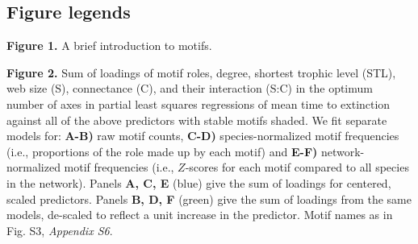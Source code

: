 \documentclass[12pt]{article}
\begin{document}
\begin{spacing}{2.0}
\section*{Figure legends}

        \textbf{Figure 1.} A brief introduction to motifs.

        \vspace{12pt}

        \noindent \textbf{Figure 2.} Sum of loadings of motif roles, degree, shortest trophic level (STL), web size (S), connectance (C), and their interaction (S:C) in the optimum number of axes in partial least squares regressions of mean time to extinction against all of the above predictors with stable motifs shaded. We fit separate models for: \textbf{A-B)} raw motif counts, \textbf{C-D)} species-normalized motif frequencies (i.e., proportions of the role made up by each motif) and \textbf{E-F)} network-normalized motif frequencies (i.e., $Z$-scores for each motif compared to all species in the network). 
    	Panels \textbf{A, C, E} (blue) give the sum of loadings for centered, scaled predictors.
    	Panels \textbf{B, D, F} (green) give the sum of loadings from the same models, de-scaled to reflect a unit increase in the predictor.
    	Motif names as in Fig. S3, \emph{Appendix S6}.


    \vspace{12pt}


\end{spacing}
\end{document}
